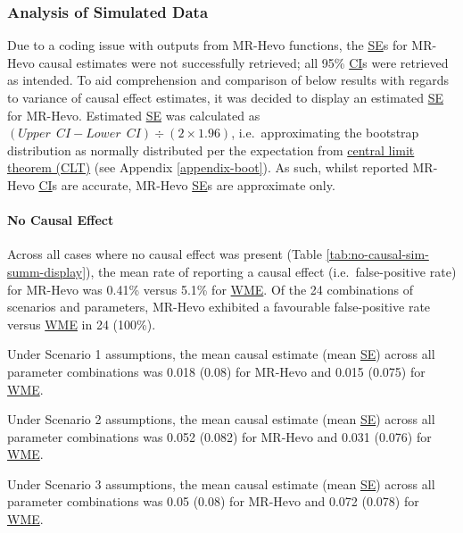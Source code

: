 \documentclass[
]{article}
\begin{document}
\subsubsection{Analysis of Simulated Data}\label{analysis-of-simulated-data-1}

Due to a coding issue with outputs from MR-Hevo functions, the \hyperref[acronyms_SE]{SE}s for MR-Hevo causal estimates were not successfully retrieved; all 95\% \hyperref[acronyms_CI]{CI}s were retrieved as intended. To aid comprehension and comparison of below results with regards to variance of causal effect estimates, it was decided to display an estimated \hyperref[acronyms_SE]{SE} for MR-Hevo. Estimated \hyperref[acronyms_SE]{SE} was calculated as \((Upper~~CI - Lower~~CI) \div (2 \times 1.96)\), i.e.~approximating the bootstrap distribution as normally distributed per the expectation from \hyperref[acronyms_CLT]{central limit theorem (CLT)} (see Appendix \ref{appendix-boot}). As such, whilst reported MR-Hevo \hyperref[acronyms_CI]{CI}s are accurate, MR-Hevo \hyperref[acronyms_SE]{SE}s are approximate only.

\paragraph{No Causal Effect}\label{results-sim-no-causal}

\leavevmode\newline Across all cases where no causal effect was present (Table \ref{tab:no-causal-sim-summ-display}), the mean rate of reporting a causal effect (i.e.~false-positive rate) for MR-Hevo was 0.41\% versus 5.1\% for \hyperref[acronyms_WME]{WME}. Of the 24 combinations of scenarios and parameters, MR-Hevo exhibited a favourable false-positive rate versus \hyperref[acronyms_WME]{WME} in 24 (100\%).

Under Scenario 1 assumptions, the mean causal estimate (mean \hyperref[acronyms_SE]{SE}) across all parameter combinations was 0.018 (0.08) for MR-Hevo and 0.015 (0.075) for \hyperref[acronyms_WME]{WME}.

Under Scenario 2 assumptions, the mean causal estimate (mean \hyperref[acronyms_SE]{SE}) across all parameter combinations was 0.052 (0.082) for MR-Hevo and 0.031 (0.076) for \hyperref[acronyms_WME]{WME}.

Under Scenario 3 assumptions, the mean causal estimate (mean \hyperref[acronyms_SE]{SE}) across all parameter combinations was 0.05 (0.08) for MR-Hevo and 0.072 (0.078) for \hyperref[acronyms_WME]{WME}.
\end{document}
